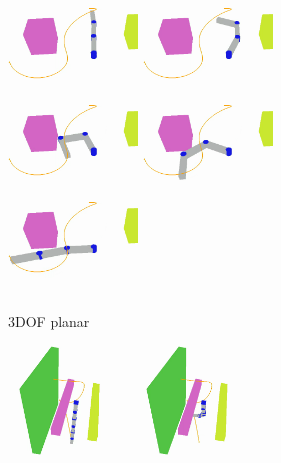 \documentclass[letterpaper, 10 pt, conference]{ieeeconf}  %
\begin{document}
\begin{figure}[t!]
	\centering
	\begin{subfigure}[b]{\textwidth}
	    \centering
		\includegraphics[height=2.45cm]{fig/planning_efficiency/3dof_1}
		\includegraphics[height=2.45cm]{fig/planning_efficiency/3dof_2}
		\includegraphics[height=2.45cm]{fig/planning_efficiency/3dof_3}
		\includegraphics[height=2.45cm]{fig/planning_efficiency/3dof_4}
		\includegraphics[height=2.45cm]{fig/planning_efficiency/3dof_5}
		\caption{3DOF planar}
		\label{fig:planning_efficiency:3dof:example}
	\end{subfigure}
	\begin{subfigure}[b]{\textwidth}
	    \centering
		\includegraphics[height=3cm]{fig/planning_efficiency/6dof_1}
		\includegraphics[height=3cm]{fig/planning_efficiency/6dof_2}

\end{subfigure}
\end{figure}
\end{document}
